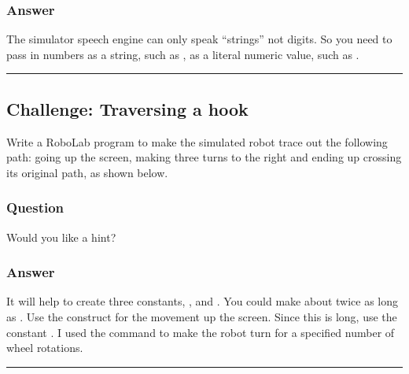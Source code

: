 \documentclass[letterpaper,10pt,english]{sphinxmanual}
\let\sphinxpxdimen\pdfpxdimen\else\newdimen\sphinxpxdimen
\begin{document}
{\subsubsection{Answer}
\label{\detokenize{content/02_Robot_Lab/Section_00_03:Answer}}
The simulator speech engine can only speak “strings” not digits. So you need to pass in numbers as a string, such as \sphinxcode{\sphinxupquote{\textquotesingle{}2\textquotesingle{}}},  as a literal numeric value, such as .


\bigskip\hrule\bigskip



\subsection{Challenge: Traversing a hook}
\label{\detokenize{content/02_Robot_Lab/Section_00_03:Challenge:-Traversing-a-hook}}
Write a RoboLab program to make the simulated robot trace out the following path: going up the screen, making three turns to the right and ending up crossing its original path, as shown below.

\sphinxincludegraphics[width=104\sphinxpxdimen,height=105\sphinxpxdimen]{{tm129_rob_p3_f022}.jpg}


\subsubsection{Question}
\label{\detokenize{content/02_Robot_Lab/Section_00_03:id1}}
Would you like a hint?


\subsubsection{Answer}
\label{\detokenize{content/02_Robot_Lab/Section_00_03:id2}}
It will help to create three constants, ,  and . You could make  about twice as long as . Use the  construct for the movement up the screen. Since this is long, use the constant . I used the  command to make the robot turn for a specified number of wheel rotations.


\bigskip\hrule\bigskip



}
\end{document}
